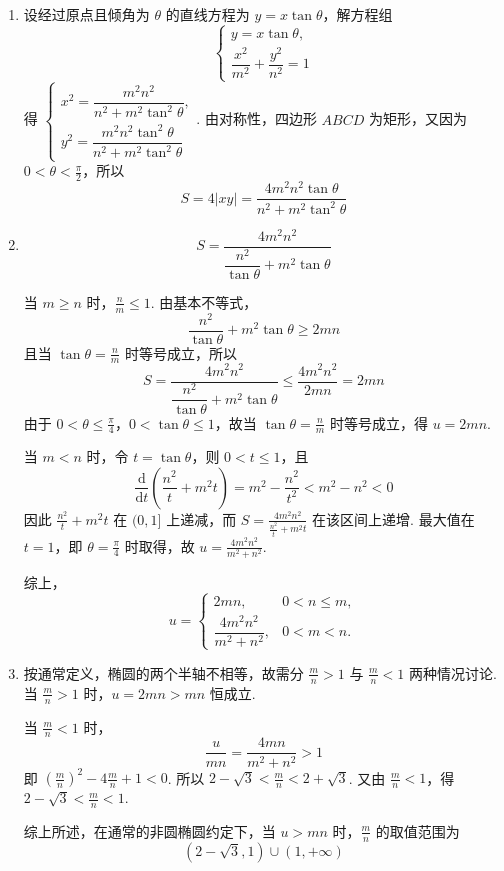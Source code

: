 \documentclass[UTF8,a4paper,oneside,11pt]{ctexbook}
\begin{document}
\begin{solution}
\begin{enumerate}
\item 设经过原点且倾角为 \(\theta\) 的直线方程为 \(y=x\tan\theta\)，解方程组
\[
\begin{cases}
y=x\tan\theta,\\
\dfrac{x^2}{m^2}+\dfrac{y^2}{n^2}=1
\end{cases}
\]
得 \(\begin{cases}
x^2=\dfrac{m^2n^2}{n^2+m^2\tan^2\theta},\\
y^2=\dfrac{m^2n^2\tan^2\theta}{n^2+m^2\tan^2\theta}
\end{cases}\).
由对称性，四边形 \(ABCD\) 为矩形，又因为 \(0<\theta<\frac{\pi}{2}\)，所以
\[
S=4|xy|=\frac{4m^2n^2\tan\theta}{n^2+m^2\tan^2\theta}
\]

\item
\[
S=\frac{4m^2n^2}{\dfrac{n^2}{\tan\theta}+m^2\tan\theta}
\]

当 \(m\geqslant n\) 时，\(\frac{n}{m}\leqslant1\). 由基本不等式，
\[
\frac{n^2}{\tan\theta}+m^2\tan\theta\geqslant2mn
\]
且当 \(\tan\theta=\frac{n}{m}\) 时等号成立，所以
\[
S=\frac{4m^2n^2}{\dfrac{n^2}{\tan\theta}+m^2\tan\theta}\leqslant\frac{4m^2n^2}{2mn}=2mn
\]
由于 \(0<\theta\leqslant\frac{\pi}{4}\)，\(0<\tan\theta\leqslant1\)，故当 \(\tan\theta=\frac{n}{m}\) 时等号成立，得 \(u=2mn\).

当 \(m<n\) 时，令 \(t=\tan\theta\)，则 \(0<t\leqslant1\)，且
\[
\frac{\mathrm d}{\mathrm dt}\left(\frac{n^2}{t}+m^2t\right)=m^2-\frac{n^2}{t^2}<m^2-n^2<0
\]
因此 \(\frac{n^2}{t}+m^2t\) 在 \((0,1]\) 上递减，而 \(S=\frac{4m^2n^2}{\frac{n^2}{t}+m^2t}\) 在该区间上递增. 最大值在 \(t=1\)，即 \(\theta=\frac\pi4\) 时取得，故 \(u=\frac{4m^2n^2}{m^2+n^2}\).

综上，
\[
u=\begin{cases}
2mn,&0<n\leqslant m,\\
\dfrac{4m^2n^2}{m^2+n^2},&0<m<n.
\end{cases}
\]

\item 按通常定义，椭圆的两个半轴不相等，故需分 \(\frac{m}{n}>1\) 与 \(\frac{m}{n}<1\) 两种情况讨论. 当 \(\frac{m}{n}>1\) 时，\(u=2mn>mn\) 恒成立.

当 \(\frac{m}{n}<1\) 时，
\[
\frac{u}{mn}=\frac{4mn}{m^2+n^2}>1
\]
即 \(\left(\frac{m}{n}\right)^2-4\frac{m}{n}+1<0\).
所以 \(2-\sqrt{3}<\frac{m}{n}<2+\sqrt{3}\). 又由 \(\frac{m}{n}<1\)，得 \(2-\sqrt{3}<\frac{m}{n}<1\).

综上所述，在通常的非圆椭圆约定下，当 \(u>mn\) 时，\(\frac{m}{n}\) 的取值范围为
\[
\left(2-\sqrt{3},1\right)\cup\left(1,+\infty\right)
\]
\end{enumerate}
\end{solution}
\end{document}
